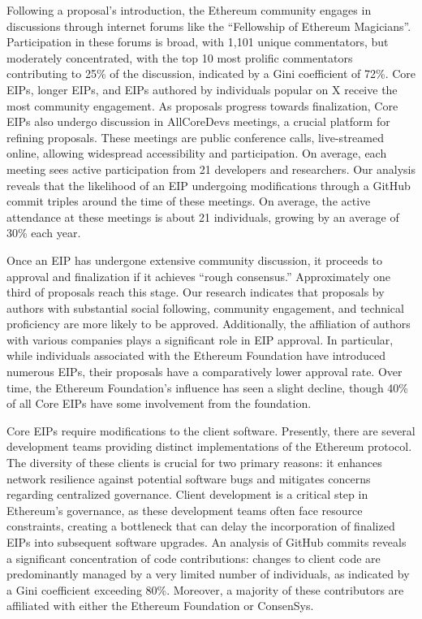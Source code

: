 \documentclass[No]{AEA}
\begin{document}
Following a proposal's introduction, the Ethereum community engages in discussions through internet forums like the ``Fellowship of Ethereum Magicians''. Participation in these forums is broad, with 1,101 unique commentators, but moderately concentrated,  with the top 10 most prolific commentators contributing to 25\% of the discussion, indicated by a Gini coefficient of 72\%. Core EIPs, longer EIPs, and EIPs authored by individuals popular on X receive the most community engagement. As proposals progress towards finalization, Core EIPs also undergo discussion in AllCoreDevs meetings, a crucial platform for refining proposals. These meetings are public conference calls, live-streamed online, allowing widespread accessibility and participation. On average, each meeting sees active participation from 21 developers and researchers. Our analysis reveals that the likelihood of an EIP undergoing modifications through a GitHub commit triples around the time of these meetings. On average, the active attendance at these meetings is about 21 individuals, growing by an average of 30\% each year.

Once an EIP has undergone extensive community discussion, it proceeds to approval and finalization if it achieves ``rough consensus.'' Approximately one third of proposals reach this stage. Our research indicates that proposals by authors with substantial social following, community engagement, and technical proficiency are more likely to be approved. Additionally, the affiliation of authors with various companies plays a significant role in EIP approval. In particular, while individuals associated with the Ethereum Foundation have introduced numerous EIPs, their proposals have a comparatively lower approval rate. Over time, the Ethereum Foundation's influence has seen a slight decline, though 40\% of all Core EIPs have some involvement from the foundation. 

Core EIPs require modifications to the client software. Presently, there are several development teams providing distinct implementations of the Ethereum protocol. The diversity of these clients is crucial for two primary reasons: it enhances network resilience against potential software bugs and mitigates concerns regarding centralized governance. Client development is a critical step in Ethereum's governance, as these development teams often face resource constraints, creating a bottleneck that can delay the incorporation of finalized EIPs into subsequent software upgrades. An analysis of GitHub commits reveals a significant concentration of code contributions: changes to client code are predominantly managed by a very limited number of individuals, as indicated by a Gini coefficient exceeding 80\%. Moreover, a majority of these contributors are affiliated with either the Ethereum Foundation or ConsenSys.
\end{document}
